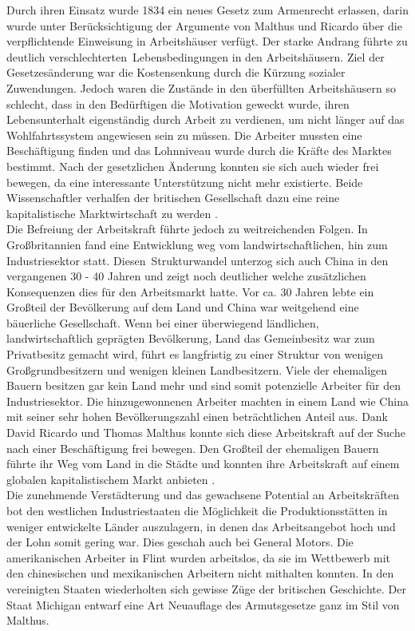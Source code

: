  Durch ihren Einsatz wurde 1834 ein neues Gesetz zum Armenrecht erlassen, darin wurde unter Berücksichtigung der Argumente von Malthus und Ricardo über die verpflichtende Einweisung in Arbeitshäuser verfügt. Der starke Andrang führte zu deutlich verschlechterten~Lebensbedingungen in den Arbeitshäusern. Ziel der Gesetzesänderung war die Kostensenkung durch die Kürzung sozialer Zuwendungen. Jedoch waren die Zustände in den überfüllten Arbeitshäusern so schlecht, dass in den Bedürftigen die Motivation geweckt wurde, ihren Lebensunterhalt eigenständig durch Arbeit zu verdienen, um nicht länger auf das Wohlfahrtssystem angewiesen sein zu müssen. Die Arbeiter mussten eine Beschäftigung finden und das Lohnniveau wurde durch die Kräfte des Marktes bestimmt. Nach der gesetzlichen Änderung konnten sie sich auch wieder frei bewegen, da eine interessante Unterstützung nicht mehr existierte. Beide Wissenschaftler verhalfen der britischen Gesellschaft dazu eine reine kapitalistische Marktwirtschaft zu werden \cite{Wende.2001}.\\
%
Die Befreiung der Arbeitskraft führte jedoch zu weitreichenden Folgen. In Großbritannien fand eine Entwicklung weg vom landwirtschaftlichen, hin zum Industriesektor statt. Diesen~Strukturwandel unterzog sich auch China in den vergangenen 30 - 40 Jahren und zeigt noch deutlicher welche zusätzlichen Konsequenzen dies für den Arbeitsmarkt hatte.  Vor ca. 30 Jahren lebte ein Großteil der Bevölkerung auf dem Land und China war weitgehend eine bäuerliche Gesellschaft. Wenn bei einer überwiegend ländlichen, landwirtschaftlich geprägten Bevölkerung, Land das Gemeinbesitz war zum Privatbesitz gemacht wird, führt es langfristig zu einer Struktur von wenigen Großgrundbesitzern und wenigen kleinen Landbesitzern. Viele der ehemaligen Bauern besitzen gar kein Land mehr und  sind somit potenzielle Arbeiter für den Industriesektor. Die hinzugewonnenen Arbeiter machten in einem Land wie China mit seiner sehr hohen Bevölkerungszahl einen beträchtlichen Anteil aus. Dank David Ricardo und Thomas Malthus konnte sich diese Arbeitskraft auf der Suche nach einer Beschäftigung frei bewegen. Den Großteil der ehemaligen Bauern führte ihr Weg vom Land in die Städte und konnten ihre Arbeitskraft auf einem globalen kapitalistischem Markt anbieten \cite[Kapitel 1, S. 34]{Franke.2013,Menzel.2013,Reisach.1997}.\\
%
Die zunehmende Verstädterung und das gewachsene Potential an Arbeitskräften bot den westlichen Industriestaaten die Möglichkeit die Produktionsstätten in weniger entwickelte Länder auszulagern, in denen das Arbeitsangebot hoch und der Lohn somit gering war. Dies geschah auch bei General Motors. Die amerikanischen Arbeiter in Flint wurden arbeitslos, da sie im Wettbewerb mit den chinesischen und mexikanischen Arbeitern nicht mithalten konnten. In den vereinigten Staaten wiederholten sich gewisse Züge der britischen Geschichte. Der Staat Michigan entwarf eine Art Neuauflage des Armutsgesetze ganz im Stil von Malthus.\\
